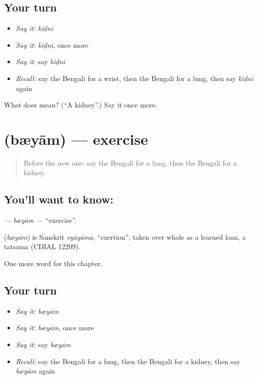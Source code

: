 \subsection*{Your turn}
\begin{itemize}
\raggedright
  \item \emph{Say it:} \emph{kiḍni}
  \item \emph{Say it:} \emph{kiḍni}, once more
  \item \emph{Say it:} say \emph{kiḍni}
  \item \emph{Recall:} say the Bengali for a wrist, then the Bengali for a lung, then say \emph{kiḍni} again
\end{itemize}

\begin{tcolorbox}[breakable,colback=teal!4,colframe=teal!35!black,title={Before you move on}]
What does  mean? (\textquotedblleft{}A kidney\textquotedblright{}.) Say it once more.
\end{tcolorbox}
\section[\texorpdfstring{\bn{ব্যায়াম} (bæyām)}{ব্যায়াম (bæyām)}]{ (bæyām) — exercise}

\label{lesson:BN-C155-byam}



\begin{quote}
Before the new one: say the Bengali for a lung, then the Bengali for a kidney.
\end{quote}

\subsection*{You'll want to know: }
\textbf{} — \emph{bæyām} — \textquotedblleft{}exercise\textquotedblright{}.

\begin{cousinweb}
\textbf{} (\emph{bæyām}) is Sanskrit \emph{vyāyāma}, \textquotedblleft{}exertion\textquotedblright{}, taken over whole as a learned loan, a tatsama (CDIAL 12209).
\end{cousinweb}

\begin{grammarlens}[title={What you've built}]
One more word for this chapter.
\end{grammarlens}

\subsection*{Your turn}
\begin{itemize}
\raggedright
  \item \emph{Say it:} \emph{bæyām}
  \item \emph{Say it:} \emph{bæyām}, once more
  \item \emph{Say it:} say \emph{bæyām}
  \item \emph{Recall:} say the Bengali for a lung, then the Bengali for a kidney, then say \emph{bæyām} again
\end{itemize}

